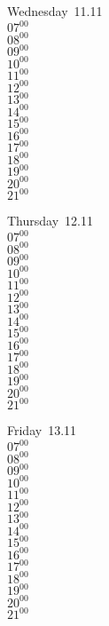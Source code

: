 \documentclass[11pt,a4paper]{book}\usepackage[]{graphicx}\usepackage[]{color}
\begin{document}
\begin{weekdaybox}
  Wednesday~11.11\\
  { 
  \vfill
  $07^{00}$\\
$08^{00}$\\
$09^{00}$\\
$10^{00}$\\
$11^{00}$\\
$12^{00}$\\
$13^{00}$\\
$14^{00}$\\
$15^{00}$\\
$16^{00}$\\
$17^{00}$\\
$18^{00}$\\
$19^{00}$\\
$20^{00}$\\
$21^{00}$\\
  }
\end{weekdaybox}
\clearpage
\begin{headerbox}
\end{headerbox}
\begin{weekdaybox}
  Thursday~12.11\\
  { 
  \vfill
  $07^{00}$\\
$08^{00}$\\
$09^{00}$\\
$10^{00}$\\
$11^{00}$\\
$12^{00}$\\
$13^{00}$\\
$14^{00}$\\
$15^{00}$\\
$16^{00}$\\
$17^{00}$\\
$18^{00}$\\
$19^{00}$\\
$20^{00}$\\
$21^{00}$\\
  }
\end{weekdaybox} 
\begin{weekdaybox}
  Friday~13.11\\
  { 
  \vfill
  $07^{00}$\\
$08^{00}$\\
$09^{00}$\\
$10^{00}$\\
$11^{00}$\\
$12^{00}$\\
$13^{00}$\\
$14^{00}$\\
$15^{00}$\\
$16^{00}$\\
$17^{00}$\\
$18^{00}$\\
$19^{00}$\\
$20^{00}$\\
$21^{00}$\\
  }
\end{weekdaybox}
\end{document}
